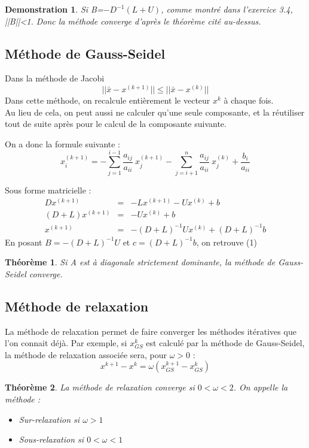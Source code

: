 \documentclass{article}
\theoremstyle{mes_theoremes}
\newtheorem*{dem}{Demonstration}
\newtheorem*{theo}{Théorème}
\begin{document}
\begin{dem}
Si B=$-D^{-1}(L+U)$, comme montré dans l'exercice 3.4, ||B||<1. Donc la méthode converge d'après le théorème cité au-dessus.
\end{dem}

\subsection{Méthode de Gauss-Seidel}
Dans la méthode de Jacobi \[||\bar{x} - x^{(k+1)}|| \leq ||\bar{x}-x^{(k)}|| \]
Dans cette méthode, on recalcule entièrement le vecteur $x^k$ à chaque fois. \\
Au lieu de cela, on peut aussi ne calculer qu'une seule composante, et la réutiliser tout de suite après pour le calcul de la composante suivante.

On a donc la formule suivante :
\[x_i^{(k+1)} = -\sum_{j=1}^{i-1} \frac{a_{ij}}{a_{ii}}\ x_j^{(k+1)} - \sum_{j=i+1}^n \frac{a_{ij}}{a_{ii}}\ x_j^{(k)}+ \frac{b_i}{a_{ii}}\]

Sous forme matricielle :
\begin{eqnarray*}
Dx^{(k+1)}&=&-Lx^{(k+1)} -Ux^{(k)} + b \\
(D+L)x^{(k+1)}&=&-Ux^{(k)} + b \\
x^{(k+1)}&=&-(D+L)^{-1}Ux^{(k)} + (D+L)^{-1}b
\end{eqnarray*}
En posant $B=-(D+L)^{-1}U$ et $c=(D+L)^{-1}b$, on retrouve (1)

\begin{theo}
Si A est à diagonale strictement dominante, la méthode de Gauss-Seidel converge.
\end{theo}

\subsection{Méthode de relaxation}
La méthode de relaxation permet de faire converger les méthodes itératives que l'on connait déjà. Par exemple, si $x_{GS}^k$ est calculé par la méthode de Gauss-Seidel, la méthode de relaxation associée sera, pour $\omega >0$ : \[x^{k+1} - x^k = \omega (x_{GS}^{k+1} - x_{GS}^k)\]

\begin{theo}
La méthode de relaxation converge si $0<\omega <2$. On appelle la méthode :
\begin{itemize}
\item Sur-relaxation si $\omega >1$
\item Sous-relaxation si $0<\omega <1$
\end{itemize}
\end{theo}
\end{document}
